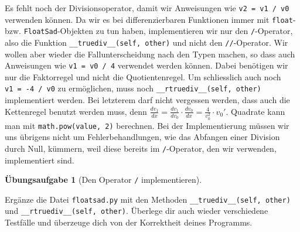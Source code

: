 \documentclass[
  letterpaper,
  DIV=11,
  oneside]{scrreprt}
\theoremstyle{definition}
\newtheorem{exercise}{Übungsaufgabe}[chapter]
\theoremstyle{definition}
\theoremstyle{remark}
\begin{document}
Es fehlt noch der Divisionsoperator, damit wir Anweisungen wie
\texttt{v2\ =\ v1\ /\ v0} verwenden können. Da wir es bei
differenzierbaren Funktionen immer mit \texttt{float}- bzw.
\texttt{FloatSad}-Objekten zu tun haben, implementieren wir nur den
\texttt{/}-Operator, also die Funktion
\texttt{\_\_truediv\_\_(self,\ other)} und nicht den
\texttt{//}-Operator. Wir wollen aber wieder die Fallunterscheidung nach
den Typen machen, so dass auch Anweisungen wie \texttt{v1\ =\ v0\ /\ 4}
verwendet werden können. Dabei benötigen wir nur die Faktorregel und
nicht die Quotientenregel. Um schliesslich auch noch
\texttt{v1\ =\ -4\ /\ v0} zu ermöglichen, muss noch
\texttt{\_\_rtruediv\_\_(self,\ other)} implementiert werden. Bei
letzterem darf nicht vergessen werden, dass auch die Kettenregel benutzt
werden muss, denn
\(\frac{dv_1}{dx} = \frac{dv_1}{dv_0}\cdot \frac{dv_0}{dx} = \frac{4}{v_0^2}\cdot v_0'\).
Quadrate kann man mit \texttt{math.pow(value,\ 2)} berechnen. Bei der
Implementierung müssen wir uns übrigens nicht um Fehlerbehandlungen, wie
das Abfangen einer Division durch Null, kümmern, weil diese bereits im
\texttt{/}-Operator, den wir verwenden, implementiert sind.

\leavevmode{}%
\begin{exercise}[Den Operator \texttt{/}
implementieren]\label{exr-ImplementTrueDiv}

Ergänze die Datei \texttt{floatsad.py} mit den Methoden
\texttt{\_\_truediv\_\_(self,\ other)} und
\texttt{\_\_rtruediv\_\_(self,\ other)}. Überlege dir auch wieder
verschiedene Testfälle und überzeuge dich von der Korrektheit deines
Programms.

\end{exercise}
\end{document}
